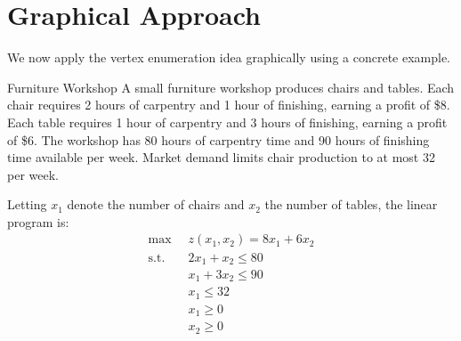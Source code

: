 \section{Graphical Approach}\label{sec:graphical-approach}
We now apply the vertex enumeration idea graphically using a concrete example.

\begin{example}{Furniture Workshop}\label{ex:FurnitureWorkshop}
A small furniture workshop produces chairs and tables. Each chair requires 2 hours of carpentry and 1 hour of finishing, earning a profit of \$8. Each table requires 1 hour of carpentry and 3 hours of finishing, earning a profit of \$6. The workshop has 80 hours of carpentry time and 90 hours of finishing time available per week. Market demand limits chair production to at most 32 per week.

Letting $x_1$ denote the number of chairs and $x_2$ the number of tables, the linear program is:
\begin{equation}
\begin{aligned}
\max\;\;& z(x_1,x_2) = 8x_1 + 6x_2\\
\text{s.t.}\;\;&  2x_1 + x_2 \leq 80\\
& x_1 + 3x_2 \leq 90\\
& x_1 \leq 32\\
& x_1 \geq 0\\
& x_2 \geq 0
\end{aligned}
\label{eqn:FurnitureWorkshop}
\end{equation}
\end{example}

